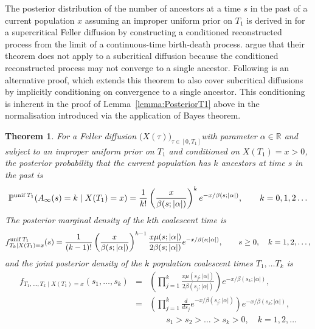 \documentclass[preprint,12pt]{elsarticle}
\newtheorem{theorem}{Theorem}
\begin{document}
The posterior distribution of the number of ancestors at a time $s$ in the past of a current population $x$ assuming an improper uniform prior 
on $T_1$ is derived in \citet[Theorem~4]{BurdenGriffiths24} for a supercritical Feller diffusion by constructing a conditioned reconstructed process 
from the limit of a continuous-time birth-death process.  \citet[Section~6]{BurdenGriffiths24} argue that their theorem does not apply to a subcritical 
diffusion because the conditioned reconstructed 
process may not converge to a single ancestor.  Following is an alternative proof, which extends this theorem to also cover subcritical diffusions
by implicitly conditioning on convergence to a single ancestor.  This conditioning is inherent in the proof of Lemma~\ref{lemma:PosteriorT1} above 
in the normalisation introduced via the application of Bayes theorem.  
\begin{theorem}	\label{theorem:unifT1Distribs}
For a Feller diffusion $\big(X(\tau)\big)_{\tau \in [0, T_1]}$with parameter $\alpha \in \mathbb{R}$ and  
subject to an improper uniform prior on $T_1$ and conditioned on $X(T_1) = x > 0$, the posterior probability 
that the current population has $k$ ancestors at time $s$ in the past is 
\begin{equation}		\label{PoisAncestors}
\mathbb{P}^{{\rm unif}\,T_1}(A_\infty(s) = k \mid X(T_1) = x) 
	= \frac{1}{k!} \left(\frac{x}{\beta(s; |\alpha|)} \right)^k e^{-x/\beta(s; |\alpha|)}, \qquad k = 0, 1, 2 \ldots
\end{equation}
The posterior marginal density of the $k$th coalescent time is 
\[
f_{T_k \mid X(T_1) = x}^{{\rm unif}\,T_1}(s) = 
	\frac{1}{(k - 1)!} \left(\frac{x}{\beta(s; |\alpha|)} \right)^{k - 1} \frac{x\mu(s; |\alpha|)}{2\beta(s; |\alpha|)} e^{-x/\beta(s; |\alpha|)}, \qquad s \ge 0,\quad k = 1, 2, \ldots,  
\]
and the joint posterior density of the $k$ population coalescent times $T_1, \ldots T_k$ is 
\begin{eqnarray*}
f_{T_1, \ldots, T_k \mid X(T_1) = x}(s_1, \ldots, s_k) & = & \left(\prod_{j = 1}^k \frac{x \mu(s_j; |\alpha|)}{2\beta(s_j; |\alpha|)} \right) e^{-x/\beta(s_k; |\alpha|)}, \nonumber \\
	& = & \left(\prod_{j = 1}^k \frac{d}{ds_j} e^{-x/\beta(s_j; |\alpha|)} \right) e^{-x/\beta(s_k; |\alpha|)}, \nonumber \\
	&  & \qquad s_1 > s_2 > \ldots > s_k > 0,\quad k = 1, 2, \ldots 
\end{eqnarray*}
\end{theorem}
%
\end{document}

